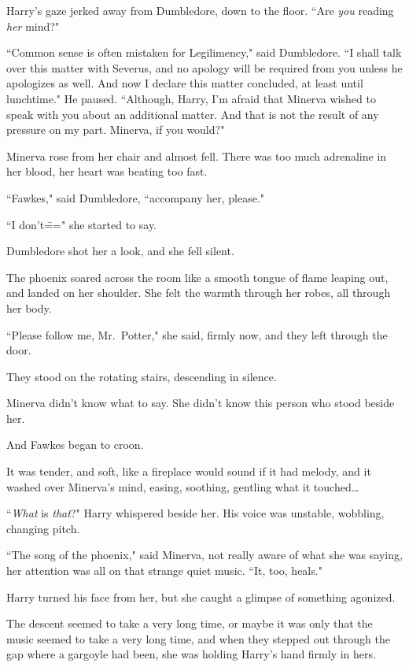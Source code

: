 Harry's gaze jerked away from Dumbledore, down to the floor. ``Are \emph{you} reading \emph{her} mind?"

``Common sense is often mistaken for Legilimency," said Dumbledore. ``I shall talk over this matter with Severus, and no apology will be required from you unless he apologizes as well. And now I declare this matter concluded, at least until lunchtime." He paused. ``Although, Harry, I'm afraid that Minerva wished to speak with you about an additional matter. And that is not the result of any pressure on my part. Minerva, if you would?"

Minerva rose from her chair and almost fell. There was too much adrenaline in her blood, her heart was beating too fast.

``Fawkes," said Dumbledore, ``accompany her, please."

``I don't\===" she started to say.

Dumbledore shot her a look, and she fell silent.

The phoenix soared across the room like a smooth tongue of flame leaping out, and landed on her shoulder. She felt the warmth through her robes, all through her body.

``Please follow me, Mr.~Potter," she said, firmly now, and they left through the door.

\later

They stood on the rotating stairs, descending in silence.

Minerva didn't know what to say. She didn't know this person who stood beside her.

And Fawkes began to croon.

It was tender, and soft, like a fireplace would sound if it had melody, and it washed over Minerva's mind, easing, soothing, gentling what it touched{\ldots}

``\emph{What} is \emph{that}?" Harry whispered beside her. His voice was unstable, wobbling, changing pitch.

``The song of the phoenix," said Minerva, not really aware of what she was saying, her attention was all on that strange quiet music. ``It, too, heals."

Harry turned his face from her, but she caught a glimpse of something agonized.

The descent seemed to take a very long time, or maybe it was only that the music seemed to take a very long time, and when they stepped out through the gap where a gargoyle had been, she was holding Harry's hand firmly in hers.

